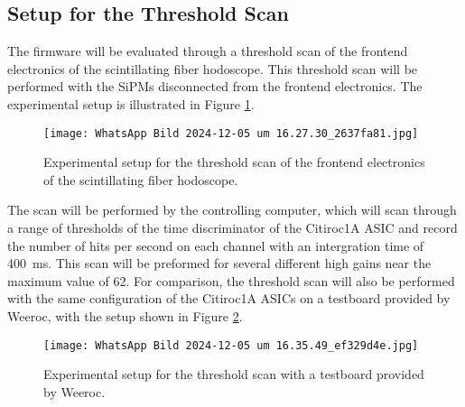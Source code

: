\subsection{Setup for the Threshold Scan}
The firmware will be evaluated through a threshold scan of the frontend electronics of the scintillating fiber hodoscope. 
This threshold scan will be performed with the SiPMs disconnected from the frontend electronics. 
The experimental setup is illustrated in Figure \ref{fig:noise_setup}.
\begin{figure}[H]
    \centering
    \texttt{[image: WhatsApp Bild 2024-12-05 um 16.27.30\_2637fa81.jpg]}%
    \caption{Experimental setup for the threshold scan of the frontend electronics of the scintillating fiber hodoscope.}
    \label{fig:noise_setup}
\end{figure}
The scan will be performed by the controlling computer, 
which will scan through a range of thresholds of the time discriminator of the Citiroc1A ASIC and record the number of hits per second on each channel with an intergration time of \SI{400}{\milli\second}.
This scan will be preformed for several different high gains near the maximum value of 62.
\newline
For comparison, the threshold scan will also be performed with the same configuration of the Citiroc1A ASICs on a testboard provided by Weeroc, 
with the setup shown in Figure \ref{fig:noise_setup_testboard}.
\begin{figure}[H]
    \centering
    \texttt{[image: WhatsApp Bild 2024-12-05 um 16.35.49\_ef329d4e.jpg]}%
    \caption{Experimental setup for the threshold scan with a testboard provided by Weeroc.}
    \label{fig:noise_setup_testboard}
\end{figure}

